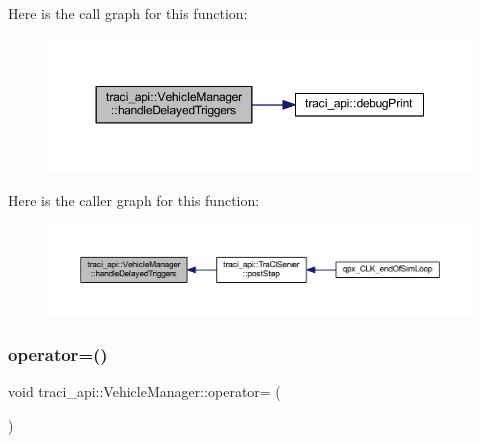 Here is the call graph for this function\+:
\nopagebreak
\begin{figure}[H]
\begin{center}
\leavevmode
\includegraphics[width=350pt]{classtraci__api_1_1_vehicle_manager_a4e656c9c9b434113e01331cf0b84babc_cgraph}
\end{center}
\end{figure}
Here is the caller graph for this function\+:
\nopagebreak
\begin{figure}[H]
\begin{center}
\leavevmode
\includegraphics[width=350pt]{classtraci__api_1_1_vehicle_manager_a4e656c9c9b434113e01331cf0b84babc_icgraph}
\end{center}
\end{figure}
\mbox{\label{classtraci__api_1_1_vehicle_manager_a3e5ca16c51d63faee6a3a9eb3a4ffafa}} 
\subsubsection{\texorpdfstring{operator=()}{operator=()}}
{\footnotesize\ttfamily void traci\+\_\+api\+::\+Vehicle\+Manager\+::operator= (\begin{DoxyParamCaption}\item[{\hyperlink{classtraci__api_1_1_vehicle_manager}{Vehicle\+Manager} const \&}]{ }\end{DoxyParamCaption})\hspace{0.3cm}{\ttfamily [delete]}}

\mbox{\label{classtraci__api_1_1_vehicle_manager_a4b246d7f01b5f37679830f677328fc16}} 
